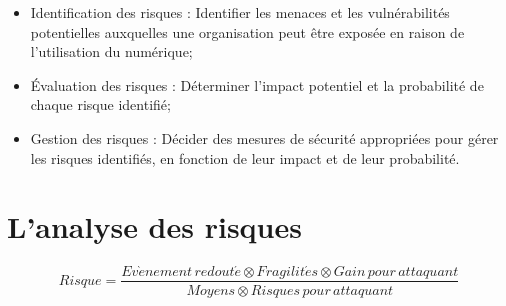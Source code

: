 \begin{itemize}
  \item Identification des risques : Identifier les menaces et les vulnérabilités potentielles auxquelles une organisation peut être exposée en raison de l'utilisation du numérique;
  \item Évaluation des risques : Déterminer l'impact potentiel et la probabilité de chaque risque identifié;
  \item Gestion des risques : Décider des mesures de sécurité appropriées pour gérer les risques identifiés, en fonction de leur impact et de leur probabilité.
\end{itemize}

\utodo

\section{L'analyse des risques}

\begin{nota}
\begin{equation}
Risque = \frac{Ev\grave{e}nement\,redout\acute{e}\otimes Fragilit\acute{e}s\otimes Gain\,pour\,attaquant}{Moyens\otimes Risques\,pour\,attaquant}
\end{equation}
\end{nota}

